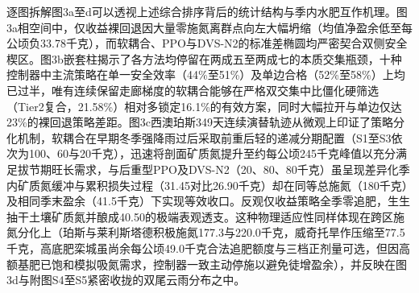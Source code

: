 \documentclass[11pt,a4paper]{article}
\begin{document}
逐图拆解图3a至d可以透视上述综合排序背后的统计结构与季内水肥互作机理。图3a相空间中，仅收益裸回退因大量零施氮离群点向左大幅坍缩（均值净盈余低至每公顷负33.78千克），而软耦合、PPO与DVS-N2的标准差椭圆均严密契合双侧安全楔区。图3b嵌套柱揭示了各方法均停留在两成五至两成七的本质交集瓶颈，十种控制器中主流策略在单一安全效率（44\%至51\%）及单边合格（52\%至58\%）上均已过半，唯有连续保留走廊梯度的软耦合能够在严格双交集中比僵化硬筛选（Tier2复合，21.58\%）相对多锁定16.1\%的有效方案，同时大幅拉开与单边仅达23\%的裸回退策略差距。图3c西澳珀斯349天连续演替轨迹从微观上印证了策略分化机制，软耦合在早期冬季强降雨过后采取前重后轻的递减分期配置（S1至S3依次为100、60与20千克），迅速将剖面矿质氮提升至约每公顷245千克峰值以充分满足拔节期旺长需求，与后重型PPO及DVS-N2（20、80、80千克）虽呈现差异化季内矿质氮缓冲与累积损失过程（31.45对比26.90千克）却在同等总施氮（180千克）及相同季末盈余（41.5千克）下实现等效收口。反观仅收益策略全季零追肥，生生抽干土壤矿质氮并酿成40.50的极端表观透支。这种物理适应性同样体现在跨区施氮分化上（珀斯与莱利斯塔德积极施氮177.3与220.0千克，威奇托旱作压缩至77.5千克，高底肥栾城虽尚余每公顷49.0千克合法追肥额度与三档正剂量可选，但因高额基肥已饱和模拟吸氮需求，控制器一致主动停施以避免徒增盈余），并反映在图3d与附图S4至S5紧密收拢的双尾云雨分布之中。
\end{document}
